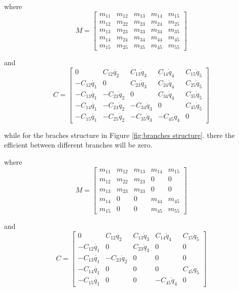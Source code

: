 where
\[
M=\left[\begin{array}{ccccc}
m_{11} & m_{12} & m_{13} & m_{14} & m_{15}\\
m_{12} & m_{22} & m_{23} & m_{24} & m_{25}\\
m_{13} & m_{23} & m_{33} & m_{34} & m_{35}\\
m_{14} & m_{24} & m_{34} & m_{44} & m_{45}\\
m_{15} & m_{25} & m_{35} & m_{45} & m_{55}\end{array}\right]
\]

and
\[
C=\left[\begin{array}{ccccc}
0 & C_{12}\dot{q_{2}} & C_{13}\dot{q}_{3} & C_{14}\dot{q}_{4} & C_{15}\dot{q}_{5}\\
-C_{12}\dot{q_{1}} & 0 & C_{23}\dot{q}_{3} & C_{24}\dot{q}_{4} & C_{25}\dot{q}_{5}\\
-C_{13}\dot{q_{1}} & -C_{23}\dot{q}_{2} & 0 & C_{34}\dot{q}_{4} & C_{35}\dot{q}_{5}\\
-C_{14}\dot{q_{1}} & -C_{24}\dot{q}_{2} & -C_{34}\dot{q}_{3} & 0 & C_{45}\dot{q}_{5}\\
-C_{15}\dot{q_{1}} & -C_{25}\dot{q}_{2} & -C_{35}\dot{q}_{3} & -C_{45}\dot{q}_{4} & 0\end{array}\right]
\]





while for the braches structure in Figure \ref{fig:branches structure}.
there the efficient between different branches will be zero.

where
\[
M=\left[\begin{array}{ccccc}
m_{11} & m_{12} & m_{13} & m_{14} & m_{15}\\
m_{12} & m_{22} & m_{23} & 0 & 0\\
m_{13} & m_{23} & m_{33} & 0 & 0\\
m_{14} & 0 & 0 & m_{44} & m_{45}\\
m_{15} & 0 & 0 & m_{45} & m_{55}\end{array}\right]
\]

and
\[
C=\left[\begin{array}{ccccc}
0 & C_{12}\dot{q_{2}} & C_{13}\dot{q}_{3} & C_{14}\dot{q}_{4} & C_{15}\dot{q}_{5}\\
-C_{12}\dot{q_{1}} & 0 & C_{23}\dot{q}_{3} & 0 & 0\\
-C_{13}\dot{q_{1}} & -C_{23}\dot{q}_{2} & 0 & 0 & 0\\
-C_{14}\dot{q_{1}} & 0 & 0 & 0 & C_{45}\dot{q}_{5}\\
-C_{15}\dot{q_{1}} & 0 & 0 & -C_{45}\dot{q}_{4} & 0\end{array}\right]
\]








